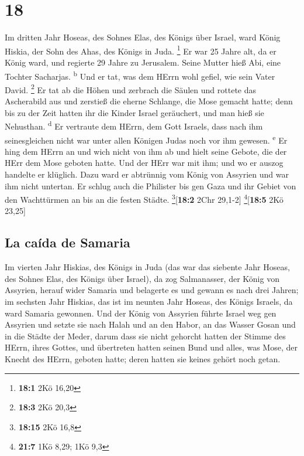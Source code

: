 \hypertarget{section-17}{%
\section{18}\label{section-17}}

 Im dritten Jahr Hoseas, des Sohnes Elas, des Königs über
Israel, ward König Hiskia, der Sohn des Ahas, des Königs in Juda.
\footnote{\textbf{18:1} 2Kö 16,20}  Er war 25 Jahre alt,
da er König ward, und regierte 29 Jahre zu Jerusalem. Seine Mutter hieß
Abi, eine Tochter Sacharjas. \textsuperscript{b}  Und er
tat, was dem HErrn wohl gefiel, wie sein Vater David. \footnote{\textbf{18:3}
  2Kö 20,3}  Er tat ab die Höhen und zerbrach die Säulen
und rottete das Ascherabild aus und zerstieß die eherne Schlange, die
Mose gemacht hatte; denn bis zu der Zeit hatten ihr die Kinder Israel
geräuchert, und man hieß sie Nehusthan. \textsuperscript{d}
 Er vertraute dem HErrn, dem Gott Israels, dass nach ihm
seinesgleichen nicht war unter allen Königen Judas noch vor ihm gewesen.
\textsuperscript{e}  Er hing dem HErrn an und wich nicht
von ihm ab und hielt seine Gebote, die der HErr dem Mose geboten hatte.
 Und der HErr war mit ihm; und wo er auszog handelte er
klüglich. Dazu ward er abtrünnig vom König von Assyrien und war ihm
nicht untertan.  Er schlug auch die Philister bis gen Gaza
und ihr Gebiet von den Wachttürmen an bis an die festen Städte.
\footnote{\textbf{18:15} 2Kö 16,8}{[}\textbf{18:2} 2Chr 29,1-2{]}
\footnote{\textbf{21:7} 1Kö 8,29; 1Kö 9,3}{[}\textbf{18:5} 2Kö 23,25{]}

\hypertarget{la-cauxedda-de-samaria}{%
\subsection{La caída de Samaria}\label{la-cauxedda-de-samaria}}

 Im vierten Jahr Hiskias, des Königs in Juda (das war das
siebente Jahr Hoseas, des Sohnes Elas, des Königs über Israel), da zog
Salmanasser, der König von Assyrien, herauf wider Samaria und belagerte
es  und gewann es nach drei Jahren; im sechsten Jahr
Hiskias, das ist im neunten Jahr Hoseas, des Königs Israels, da ward
Samaria gewonnen.  Und der König von Assyrien führte
Israel weg gen Assyrien und setzte sie nach Halah und an den Habor, an
das Wasser Gosan und in die Städte der Meder,  darum dass
sie nicht gehorcht hatten der Stimme des HErrn, ihres Gottes, und
übertreten hatten seinen Bund und alles, was Mose, der Knecht des HErrn,
geboten hatte; deren hatten sie keines gehört noch getan.

